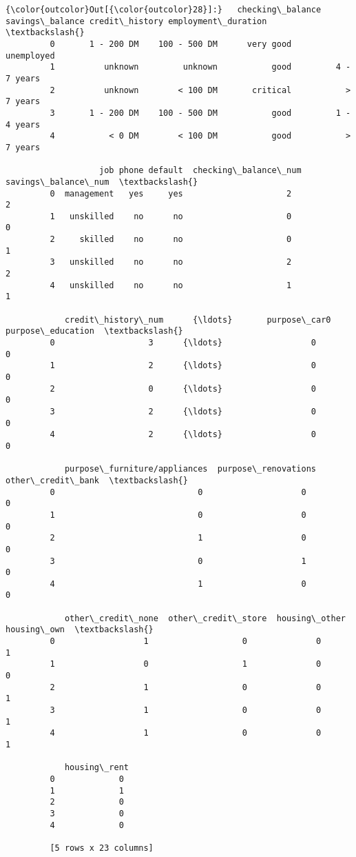 \documentclass[11pt]{article}
\begin{document}
\begin{Verbatim}[commandchars=\\\{\}]
{\color{outcolor}Out[{\color{outcolor}28}]:}   checking\_balance savings\_balance credit\_history employment\_duration  \textbackslash{}
         0       1 - 200 DM    100 - 500 DM      very good          unemployed   
         1          unknown         unknown           good         4 - 7 years   
         2          unknown        < 100 DM       critical           > 7 years   
         3       1 - 200 DM    100 - 500 DM           good         1 - 4 years   
         4           < 0 DM        < 100 DM           good           > 7 years   
         
                   job phone default  checking\_balance\_num  savings\_balance\_num  \textbackslash{}
         0  management   yes     yes                     2                    2   
         1   unskilled    no      no                     0                    0   
         2     skilled    no      no                     0                    1   
         3   unskilled    no      no                     2                    2   
         4   unskilled    no      no                     1                    1   
         
            credit\_history\_num      {\ldots}       purpose\_car0  purpose\_education  \textbackslash{}
         0                   3      {\ldots}                  0                  0   
         1                   2      {\ldots}                  0                  0   
         2                   0      {\ldots}                  0                  0   
         3                   2      {\ldots}                  0                  0   
         4                   2      {\ldots}                  0                  0   
         
            purpose\_furniture/appliances  purpose\_renovations  other\_credit\_bank  \textbackslash{}
         0                             0                    0                  0   
         1                             0                    0                  0   
         2                             1                    0                  0   
         3                             0                    1                  0   
         4                             1                    0                  0   
         
            other\_credit\_none  other\_credit\_store  housing\_other  housing\_own  \textbackslash{}
         0                  1                   0              0            1   
         1                  0                   1              0            0   
         2                  1                   0              0            1   
         3                  1                   0              0            1   
         4                  1                   0              0            1   
         
            housing\_rent  
         0             0  
         1             1  
         2             0  
         3             0  
         4             0  
         
         [5 rows x 23 columns]
\end{Verbatim}
            
\end{document}
